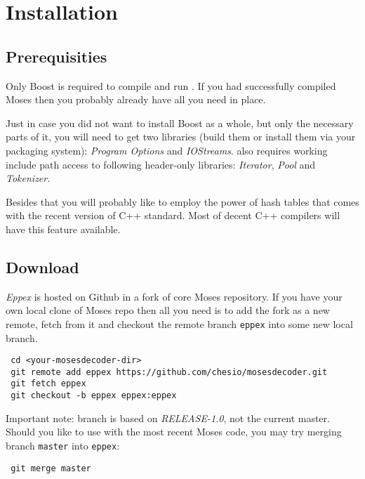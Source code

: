 \appendix
\chapter{Installation}
\label{chap:installation}


\section*{Prerequisities}

Only Boost is required to compile and run \eppex{}.
If you had successfully compiled Moses then you probably already have all you need in place.

Just in case you did not want to install Boost as a whole, but only the necessary
parts of it, you will need to get two libraries (build them or install
them via your packaging system): \emph{Program Options} and \emph{IOStreams}.
\Eppex{} also requires working include path access to following
header-only libraries: \emph{Iterator}, \emph{Pool} and \emph{Tokenizer}.

Besides that you will probably like to employ the power of hash tables
that comes with the recent version of C++ standard.
Most of decent C++ compilers will have this feature available.

\section*{Download}

\emph{Eppex} is hosted on Github in
a fork
of core Moses repository.
If you have your own local clone of Moses repo then all you need is to add
the fork as a new remote, fetch from it and checkout the remote branch
\texttt{eppex} into some new local branch.
\begin{verbatim}
 cd <your-mosesdecoder-dir>
 git remote add eppex https://github.com/chesio/mosesdecoder.git
 git fetch eppex
 git checkout -b eppex eppex:eppex
\end{verbatim}

Important note: \eppex{} branch is based on \emph{RELEASE-1.0},
not the current master. Should you like to use \eppex{} with the most
recent Moses code, you may try merging branch \texttt{master} into \texttt{eppex}:
\begin{verbatim}
 git merge master
\end{verbatim}

